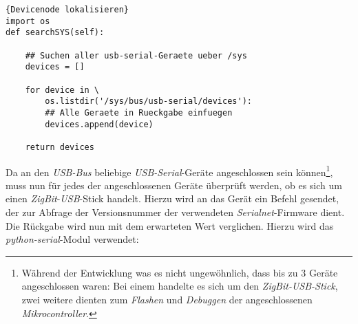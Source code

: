 \begin{lstlisting}{Devicenode lokalisieren}
import os
def searchSYS(self):

    ## Suchen aller usb-serial-Geraete ueber /sys 
    devices = []

    for device in \
        os.listdir('/sys/bus/usb-serial/devices'):
        ## Alle Geraete in Rueckgabe einfuegen
        devices.append(device)

    return devices
\end{lstlisting}

Da an den \emph{USB-Bus} beliebige \emph{USB-Serial}-Geräte angeschlossen sein können\footnote{Während der Entwicklung
was es nicht ungewöhnlich, dass bis zu 3 Geräte angeschlossen waren: Bei einem handelte es sich um den
\emph{ZigBit-USB-Stick}, zwei weitere dienten zum \emph{Flashen} und \emph{Debuggen} der angeschlossenen 
\emph{Mikrocontroller}.}, 
muss nun für jedes der angeschlossenen Geräte überprüft werden, ob es sich um einen \emph{ZigBit}-\emph{USB}-Stick
handelt. Hierzu wird an das Gerät ein Befehl gesendet, der zur Abfrage der Versionsnummer der verwendeten
\emph{Serialnet}-Firmware dient. Die Rückgabe wird nun mit dem erwarteten Wert verglichen. Hierzu wird das
\emph{python-serial}-Modul verwendet:

